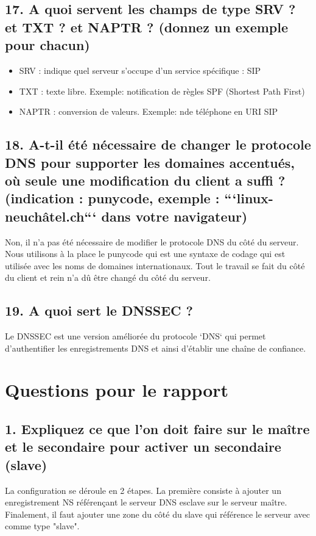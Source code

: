 \documentclass{article}
\begin{document}
\subsection*{17. A quoi servent les champs de type SRV ? et TXT ? et NAPTR ? (donnez un exemple pour chacun)}
\begin{itemize}
\item SRV : indique quel serveur s'occupe d'un service spécifique : SIP
\item TXT : texte libre. Exemple: notification de règles SPF (Shortest Path First)
\item NAPTR : conversion de valeurs. Exemple: n\degre de téléphone en URI SIP
\end{itemize}

\subsection*{18. A-t-il été nécessaire de changer le protocole DNS pour supporter les domaines accentués, où seule une modification du client a suffi ? (indication : punycode, exemple : ```linux-neuchâtel.ch``` dans votre navigateur)}
Non, il n'a pas été nécessaire de modifier le protocole DNS du côté du serveur. Nous utilisons à la place le punycode qui est une syntaxe de codage qui est utilisée avec les noms de domaines internationaux. Tout le travail se fait du côté du client et rein n'a dû être changé du côté du serveur.

\subsection*{19. A quoi sert le DNSSEC ?}
Le DNSSEC est une version améliorée du protocole `DNS` qui permet d'authentifier les enregistrements DNS et ainsi d'établir une chaîne de confiance.\cite{DNSSEC}

\section{Questions pour le rapport}
\subsection*{1. Expliquez ce que l’on doit faire sur le maître et le secondaire pour activer un secondaire (slave)\label{question-slave}}
La configuration se déroule en 2 étapes. La première consiste à ajouter un enregistrement NS référençant le serveur DNS esclave sur le serveur maître. Finalement, il faut ajouter une zone du côté du slave qui référence le serveur avec comme type "slave".\\
\end{document}
